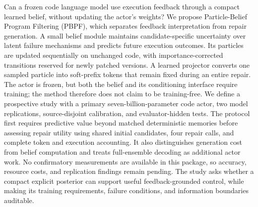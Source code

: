 Can a frozen code language model use execution feedback through a compact learned belief, without updating the actor's weights? We propose Particle-Belief Program Filtering (PBPF), which separates feedback interpretation from repair generation. A small belief module maintains candidate-specific uncertainty over latent failure mechanisms and predicts future execution outcomes. Its particles are updated sequentially on unchanged code, with importance-corrected transitions reserved for newly patched versions. A learned projector converts one sampled particle into soft-prefix tokens that remain fixed during an entire repair. The actor is frozen, but both the belief and its conditioning interface require training; the method therefore does not claim to be training-free. We define a prospective study with a primary seven-billion-parameter code actor, two model replications, source-disjoint calibration, and evaluator-hidden tests. The protocol first requires predictive value beyond matched deterministic memories before assessing repair utility using shared initial candidates, four repair calls, and complete token and execution accounting. It also distinguishes generation cost from belief computation and treats full-ensemble decoding as additional actor work. No confirmatory measurements are available in this package, so accuracy, resource costs, and replication findings remain pending. The study asks whether a compact explicit posterior can support useful feedback-grounded control, while making its training requirements, failure conditions, and information boundaries auditable.
